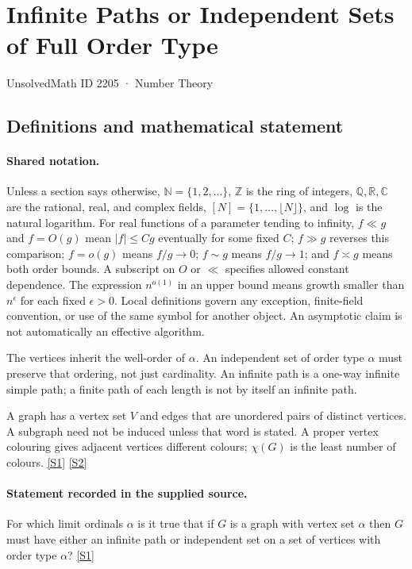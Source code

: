 \documentclass[11pt,a4paper]{article}
\newcommand{\N}{\mathbb{N}}
\newcommand{\Z}{\mathbb{Z}}
\newcommand{\Q}{\mathbb{Q}}
\newcommand{\R}{\mathbb{R}}
\newcommand{\C}{\mathbb{C}}
\newcommand{\sref}[2]{\hyperlink{source:#1:#2}{[S#2]}}
\begin{document}

\setcounter{section}{2204}

\section{Infinite Paths or Independent Sets of Full Order Type}\label{2205}

{\small\sffamily UnsolvedMath ID 2205 · Number Theory}

\subsection{Definitions and mathematical statement}

\paragraph{Shared notation.}Unless a section says otherwise, $\N=\{1,2,\ldots\}$,
$\Z$ is the ring of integers, $\Q,\R,\C$ are the rational, real, and complex
fields, $[N]=\{1,\ldots,\lfloor N\rfloor\}$, and $\log$ is the natural
logarithm. For real functions of a parameter tending to infinity,
$f\ll g$ and $f=O(g)$ mean $|f|\leq Cg$ eventually for some fixed $C$;
$f\gg g$ reverses this comparison; $f=o(g)$ means $f/g\to0$;
$f\sim g$ means $f/g\to1$; and $f\asymp g$ means both order bounds.
A subscript on $O$ or $\ll$ specifies allowed constant dependence.
The expression $n^{o(1)}$ in an upper bound means growth smaller than
$n^\epsilon$ for each fixed $\epsilon>0$. Local definitions govern any
exception, finite-field convention, or use of the same symbol for another
object. An asymptotic claim is not automatically an effective algorithm.



The vertices inherit the well-order of $\alpha$. An independent set of order type $\alpha$ must preserve that ordering, not just cardinality. An infinite path is a one-way infinite simple path; a finite path of each length is not by itself an infinite path.

A graph has a vertex set $V$ and edges that are unordered pairs of distinct vertices. A subgraph need not be induced unless that word is stated. A proper vertex colouring gives adjacent vertices different colours; $\chi(G)$ is the least number of colours. \sref{2205}{1} \sref{2205}{2}

\paragraph{Statement recorded in the supplied source.}
For which limit ordinals $\alpha$ is it true that if $G$ is a graph with vertex set $\alpha$ then $G$ must have either an infinite path or independent set on a set of vertices with order type $\alpha$? \sref{2205}{1}
\end{document}
